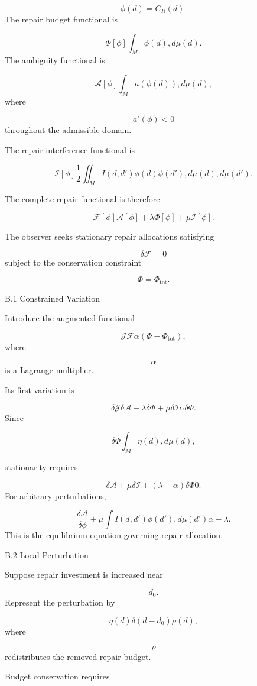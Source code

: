 \documentclass[12pt,oneside]{article}
\theoremstyle{plain}
\theoremstyle{definition}
\theoremstyle{remark}
\begin{document}
\[
\phi(d)=C_R(d).
\]
The repair budget functional is

\[
\Phi[\phi]
\int_M
\phi(d),
d\mu(d).
\]
The ambiguity functional is

\[
\mathcal A[\phi]
\int_M
a(\phi(d))
,d\mu(d),
\]
where

\[
a'(\phi)<0
\]
throughout the admissible domain.

The repair interference functional is

\[
\mathcal I[\phi]
\frac12
\iint_M
I(d,d')
\phi(d)\phi(d')
,d\mu(d),d\mu(d').
\]

The complete repair functional is therefore

\[
\mathcal F[\phi]
\mathcal A[\phi]
+
\lambda\Phi[\phi]
+
\mu\mathcal I[\phi].
\]

The observer seeks stationary repair allocations satisfying

\[
\delta\mathcal F=0
\]
subject to the conservation constraint

\[
\Phi=\Phi_{\mathrm{tot}}.
\]

B.1 Constrained Variation

Introduce the augmented functional

\[
\mathcal J
\mathcal F
\alpha
\left(
\Phi-\Phi_{\mathrm{tot}}
\right),
\]
where

\[
\alpha
\]
is a Lagrange multiplier.

Its first variation is

\[
\delta\mathcal J
\delta\mathcal A
+
\lambda\delta\Phi
+
\mu\delta\mathcal I
\alpha\delta\Phi.
\]
Since

\[
\delta\Phi
\int_M
\eta(d)
,d\mu(d),
\]

stationarity requires

\[
\delta\mathcal A
+
\mu\delta\mathcal I
+
(\lambda-\alpha)\delta\Phi
0. 
\]
For arbitrary perturbations,

\[
\frac{\delta\mathcal A}{\delta\phi}
+
\mu
\int
I(d,d')
\phi(d')
,d\mu(d')
\alpha-\lambda.
\]
This is the equilibrium equation governing repair allocation.


B.2 Local Perturbation

Suppose repair investment is increased near

\[
d_0.
\]
Represent the perturbation by

\[
\eta(d)
\delta(d-d_0)
\rho(d),
\]
where

\[
\rho
\]
redistributes the removed repair budget.

Budget conservation requires
\end{document}
